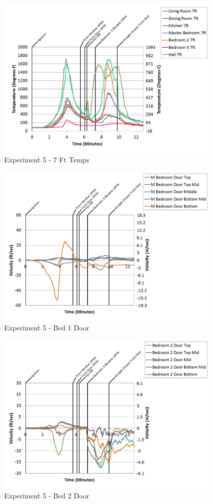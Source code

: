 \documentclass{article}
\begin{document}
\begin{appendices}
	\begin{figure}[h!]
		\centering
		\includegraphics[height=3.05in]{0_Images/Results_Charts/Exp_5_Charts/7FtTemps.pdf}
		\caption{Experiment 5 - 7 Ft Temps}
	\end{figure}
 
	\clearpage

	\begin{figure}[h!]
		\centering
		\includegraphics[height=3.05in]{0_Images/Results_Charts/Exp_5_Charts/Bed1Door.pdf}
		\caption{Experiment 5 - Bed 1 Door}
	\end{figure}
 

	\begin{figure}[h!]
		\centering
		\includegraphics[height=3.05in]{0_Images/Results_Charts/Exp_5_Charts/Bed2Door.pdf}
		\caption{Experiment 5 - Bed 2 Door}
	\end{figure}
 

\end{appendices}
\end{document}
